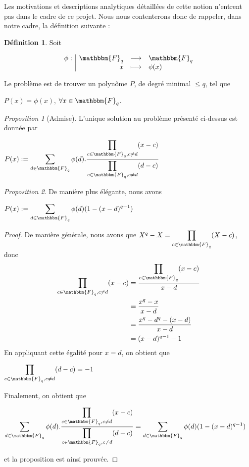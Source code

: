 \documentclass[12pt]{article}
\newcommand{\fonction}[5]{
\begin{displaymath}
\begin{array}{l|rcl}
\displaystyle
#1 : & #2 & \longrightarrow & #3 \\
    & #4 & \longmapsto & #5
\end{array}
\end{displaymath}
}
\theoremstyle{remark}\newtheorem{note}{Note}
\theoremstyle{remark}\newtheorem{nota}{Notation}
\newcommand{\Fq}{\mathbbm{F}_q}
\newtheorem{prop}{Proposition}
\theoremstyle{definition}
\newtheorem{definition}{Définition}
\begin{document}
Les motivations et descriptions analytiques détaillées de cette notion n'entrent pas dans le cadre de ce projet. Nous nous contenterons donc de rappeler, dans notre cadre, la définition suivante :

\begin{definition}
Soit
\fonction{\phi}{\Fq}{\Fq}{x}{\phi(x)}
Le problème est de trouver un polynôme $P$, de degré minimal $\le q$, tel que 
	\begin{center} $P(x) = \phi(x)$, $\forall  x \in \Fq$. \end{center}
\end{definition}

\begin{prop}[Admise]
L'unique solution au problème présenté ci-dessus est donnée par 
	\begin{center} $P(x) := \displaystyle\sum_{d \in \Fq} \phi(d).\displaystyle\frac{\displaystyle\prod_{c \in \Fq, c \ne d }(x - c)}{\displaystyle\prod_{c \in \Fq, c \ne d}(d -c)}$\end{center}
\end{prop}

\begin{prop}
De manière plus élégante, nous avons
	\begin{center} $P(x) := \displaystyle \sum_{d \in \Fq } \phi(d) (1 - (x-d)^{q-1}) $ \end{center}
\end{prop}

\begin{proof}De manière générale, nous avons que $X^q - X = \displaystyle\prod_{c \in \Fq} (X-c)$, donc \newline
	\begin{align*} 
		\displaystyle\prod_{c \in \Fq, c \ne d}(x - c) &= \frac{\displaystyle\prod_{c \in \Fq}(x - c)}{x - d}\\
		 &= \displaystyle\frac{x^q - x}{x-d} \\
		 &= \displaystyle\frac{x^q - d^q - (x-d)}{x-d} \\
		 &= (x-d)^{q-1} - 1
	\end{align*}
En appliquant cette égalité pour $x = d$, on obtient que \begin{center} $\displaystyle\prod_{c \in \Fq, c \ne d }(d - c) = -1$ \end{center}
Finalement, on obtient que 
\begin{center} $ \displaystyle\sum_{d \in \Fq} \phi(d).\displaystyle\frac{\displaystyle\prod_{c \in \Fq, c \ne d }(x - c)}{\displaystyle\prod_{c \in \Fq, c \ne d}(d -c)} =  \displaystyle \sum_{d \in \Fq } \phi(d) (1 - (x-d)^{q-1})$  \end{center}
et la proposition est ainsi prouvée.
\end{proof}
\end{document}
